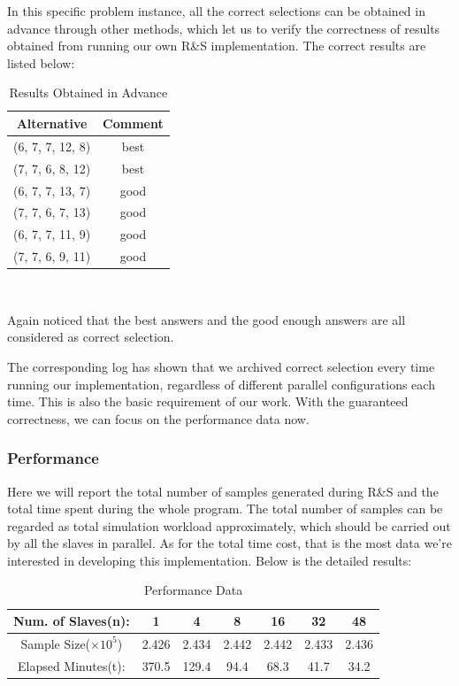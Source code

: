 In this specific problem instance, all the correct selections can be obtained in advance through other methods, which let us to verify the correctness of results obtained from running our own R\&S implementation. The correct results are listed below:

\begin{table}[ht]
\begin{center}
\begin{tabular}{|c|c|}
\hline
Alternative & Comment \\
\hline
(6, 7, 7, 12, 8) & best \\
(7, 7, 6, 8, 12) & best \\
(6, 7, 7, 13, 7) & good \\
(7, 7, 6, 7, 13) & good \\
(6, 7, 7, 11, 9) & good \\
(7, 7, 6, 9, 11) & good \\
\hline
\end{tabular} \\
\caption{Results Obtained in Advance}
\end{center}
\end{table}

Again noticed that the best answers and the good enough answers are all considered as correct selection.

The corresponding log has shown that we archived correct selection every time running our implementation, regardless of different parallel configurations each time. This is also the basic requirement of our work. With the guaranteed correctness, we can focus on the performance data now.

\subsubsection{Performance}

Here we will report the total number of samples generated during R\&S and the total time spent during the whole program. The total number of samples can be regarded as total simulation workload approximately, which should be carried out by all the slaves in parallel. As for the total time cost, that is the most data we're interested in developing this implementation. Below is the detailed results:

\begin{table}[ht]
\begin{center}
\begin{tabular}{|c|c|c|c|c|c|c|}
\hline
Num. of Slaves(n): & 1 & 4 & 8 & 16 & 32 & 48 \\
\hline
Sample Size($\times 10^5$) & 2.426 & 2.434 & 2.442 & 2.442 & 2.433 & 2.436\\
\hline
Elapsed Minutes(t): & 370.5 & 129.4 & 94.4 & 68.3 & 41.7 & 34.2 \\
\hline
\end{tabular} \\
\caption{Performance Data}
\end{center}
\end{table}


